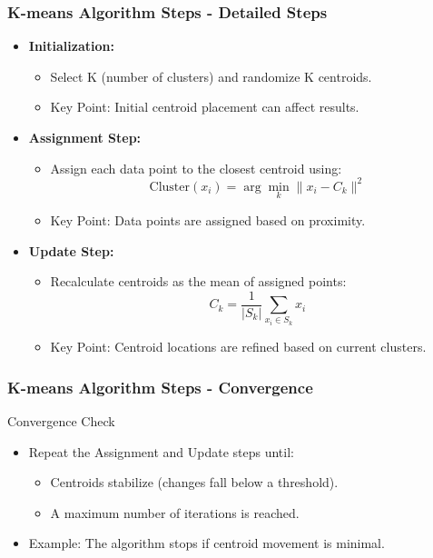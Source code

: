\documentclass[aspectratio=169]{beamer}
\begin{document}
\begin{frame}[fragile]
    \frametitle{K-means Algorithm Steps - Detailed Steps}
    \begin{itemize}
        \item \textbf{Initialization:} 
        \begin{itemize}
            \item Select K (number of clusters) and randomize K centroids.
            \item Key Point: Initial centroid placement can affect results.
        \end{itemize}

        \item \textbf{Assignment Step:}
        \begin{itemize}
            \item Assign each data point to the closest centroid using:
            \[
            \text{Cluster}(x_i) = \arg\min_{k} \| x_i - C_k \|^2
            \]
            \item Key Point: Data points are assigned based on proximity.
        \end{itemize}

        \item \textbf{Update Step:}
        \begin{itemize}
            \item Recalculate centroids as the mean of assigned points:
            \[
            C_k = \frac{1}{|S_k|} \sum_{x_i \in S_k} x_i
            \]
            \item Key Point: Centroid locations are refined based on current clusters.
        \end{itemize}
    \end{itemize}
\end{frame}

\begin{frame}[fragile]
    \frametitle{K-means Algorithm Steps - Convergence}
    \begin{block}{Convergence Check}
        \begin{itemize}
            \item Repeat the Assignment and Update steps until:
            \begin{itemize}
                \item Centroids stabilize (changes fall below a threshold).
                \item A maximum number of iterations is reached.
            \end{itemize}
            \item Example: The algorithm stops if centroid movement is minimal.
        \end{itemize}
    \end{block}
\end{frame}
\end{document}
